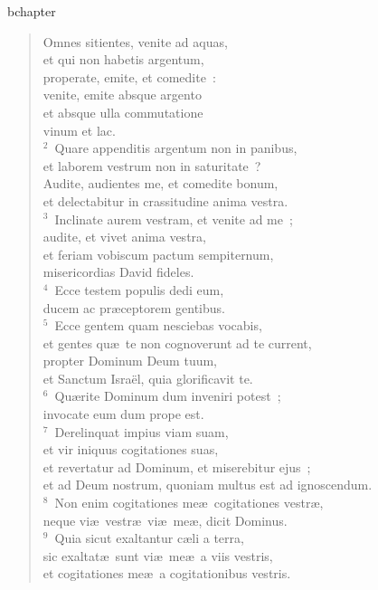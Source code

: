 bchapter\begin{verse}\vspace{-19pt}Omnes sitientes, venite ad aquas,\\ et qui non habetis argentum,\\ properate, emite, et comedite~:\\ venite, emite absque argento\\ et absque ulla commutatione\\ vinum et lac.\\
${}^{2}$~Quare appenditis argentum non in panibus,\\ et laborem vestrum non in saturitate~?\\ Audite, audientes me, et comedite bonum,\\ et delectabitur in crassitudine anima vestra.\\
${}^{3}$~Inclinate aurem vestram, et venite ad me~;\\ audite, et vivet anima vestra,\\ et feriam vobiscum pactum sempiternum,\\ misericordias David fideles.\\
${}^{4}$~Ecce testem populis dedi eum,\\ ducem ac pr\ae ceptorem gentibus.\\
${}^{5}$~Ecce gentem quam nesciebas vocabis,\\ et gentes qu\ae\ te non cognoverunt ad te current,\\ propter Dominum Deum tuum,\\ et Sanctum Isra\"el, quia glorificavit te.\\
${}^{6}$~Qu\ae rite Dominum dum inveniri potest~;\\ invocate eum dum prope est.\\
${}^{7}$~Derelinquat impius viam suam,\\ et vir iniquus cogitationes suas,\\ et revertatur ad Dominum, et miserebitur ejus~;\\ et ad Deum nostrum, quoniam multus est ad ignoscendum.\\
${}^{8}$~Non enim cogitationes me\ae\ cogitationes vestr\ae ,\\ neque vi\ae\ vestr\ae\ vi\ae\ me\ae , dicit Dominus.\\
${}^{9}$~Quia sicut exaltantur c\ae li a terra,\\ sic exaltat\ae\ sunt vi\ae\ me\ae\ a viis vestris,\\ et cogitationes me\ae\ a cogitationibus vestris.\\

\end{verse}
